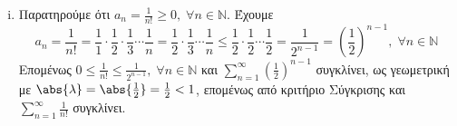 \begin{enumerate}
\begin{enumerate}[i)]
        \item Παρατηρούμε ότι $ a_{n} = \frac{1}{n!} \geq 0, \; \forall n \in 
         \mathbb{N} $. Έχουμε 
         \[
             a_{n}= \frac{1}{n!} = \frac{1}{1} \cdot \frac{1}{2} \cdot \frac{1}{3} \cdots
             \frac{1}{n} = \frac{1}{2} \cdot \frac{1}{3} \cdots \frac{1}{n} \leq 
             \frac{1}{2} \cdot \frac{1}{2} \cdots \frac{1}{2} = \frac{1}{2^{n-1}} = 
             (\frac{1}{2} )^{n-1}, 
             \; \forall n \in \mathbb{N} 
          \] 
          Επομένως $ 0 \leq \frac{1}{n!} \leq \frac{1}{2^{n-1}}, \; \forall n \in \mathbb{N} $ και $
          \sum_{n=1}^{\infty} (\frac{1}{2} )^{n-1}  $ συγκλίνει, ως γεωμετρική με 
          $ \abs{\lambda} = \abs{\frac{1}{2}} = \frac{1}{2} < 1 $, επομένως από 
          κριτήριο Σύγκρισης και $ \sum_{n=1}^{\infty} \frac{1}{n!} $ συγκλίνει.



    \end{enumerate} 
\end{enumerate}




